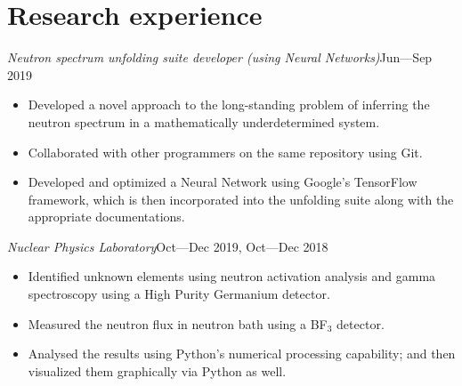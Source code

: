 \documentclass[a4paper, 12pt]{article}
\newcommand{\expentry}[3]{\emph{#1}\hfill{#2}---{#3}}
\begin{document}
\section{Research experience}
\expentry{Neutron spectrum unfolding suite developer (using Neural Networks)}{Jun}{Sep 2019}
    \begin{itemize}
    \setlength\itemsep{0em}
    \item Developed a novel approach to the long-standing problem of inferring the neutron spectrum in a mathematically underdetermined system.
    \item Collaborated with other programmers on the same repository using Git.
    \item Developed and optimized a Neural Network using Google's TensorFlow framework, which is then incorporated into the unfolding suite along with the appropriate documentations.
    \end{itemize}
\expentry{Nuclear Physics Laboratory}{Oct}{Dec 2019, Oct---Dec 2018}
    \begin{itemize}
    \setlength\itemsep{0em}
    \item Identified unknown elements using neutron activation analysis and gamma spectroscopy using a High Purity Germanium detector.
    \item Measured the neutron flux in neutron bath using a BF$_3$ detector.
    \item Analysed the results using Python’s numerical processing capability; and then visualized them graphically via Python as well.
    \end{itemize}
\end{document}
